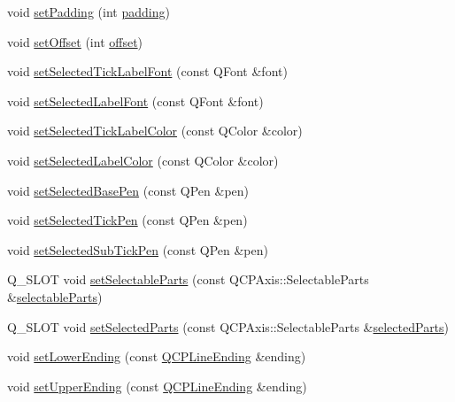 \begin{DoxyCompactItemize}
\item 
void \hyperlink{class_q_c_p_axis_a5691441cb3de9e9844855d339c0db279}{set\+Padding} (int \hyperlink{class_q_c_p_axis_abb85015a9467ec176e70698307ec833a}{padding})
\item 
void \hyperlink{class_q_c_p_axis_a04a652603cbe50eba9969ee6d68873c3}{set\+Offset} (int \hyperlink{class_q_c_p_axis_aebc032ac6eea164a02859c017f52d5e7}{offset})
\item 
void \hyperlink{class_q_c_p_axis_a845ccb560b7bc5281098a5be494145f6}{set\+Selected\+Tick\+Label\+Font} (const Q\+Font \&font)
\item 
void \hyperlink{class_q_c_p_axis_a02ec2a75d4d8401eaab834fbc6803d30}{set\+Selected\+Label\+Font} (const Q\+Font \&font)
\item 
void \hyperlink{class_q_c_p_axis_a9bdbf5e63ab15187f3a1de9440129227}{set\+Selected\+Tick\+Label\+Color} (const Q\+Color \&color)
\item 
void \hyperlink{class_q_c_p_axis_a5d502dec597c634f491fdd73d151c72d}{set\+Selected\+Label\+Color} (const Q\+Color \&color)
\item 
void \hyperlink{class_q_c_p_axis_aeb917a909215605b95ef2be843de1ee8}{set\+Selected\+Base\+Pen} (const Q\+Pen \&pen)
\item 
void \hyperlink{class_q_c_p_axis_a8360502685eb782edbf04019c9345cdc}{set\+Selected\+Tick\+Pen} (const Q\+Pen \&pen)
\item 
void \hyperlink{class_q_c_p_axis_a2a00a7166600155eac26843132eb9576}{set\+Selected\+Sub\+Tick\+Pen} (const Q\+Pen \&pen)
\item 
Q\+\_\+\+S\+L\+O\+T void \hyperlink{class_q_c_p_axis_a513f9b9e326c505d9bec54880031b085}{set\+Selectable\+Parts} (const Q\+C\+P\+Axis\+::\+Selectable\+Parts \&\hyperlink{class_q_c_p_axis_ad2bff3d2ed3d35c10d44c0c02441bd2c}{selectable\+Parts})
\item 
Q\+\_\+\+S\+L\+O\+T void \hyperlink{class_q_c_p_axis_ab9d7a69277dcbed9119b3c1f25ca19c3}{set\+Selected\+Parts} (const Q\+C\+P\+Axis\+::\+Selectable\+Parts \&\hyperlink{class_q_c_p_axis_a08323248a1cba4750ef07ceea159e0b3}{selected\+Parts})
\item 
void \hyperlink{class_q_c_p_axis_a08af1c72db9ae4dc8cb8a973d44405ab}{set\+Lower\+Ending} (const \hyperlink{class_q_c_p_line_ending}{Q\+C\+P\+Line\+Ending} \&ending)
\item 
void \hyperlink{class_q_c_p_axis_a69119b892fc306f651763596685aa377}{set\+Upper\+Ending} (const \hyperlink{class_q_c_p_line_ending}{Q\+C\+P\+Line\+Ending} \&ending)
\item 

\end{DoxyCompactItemize}
